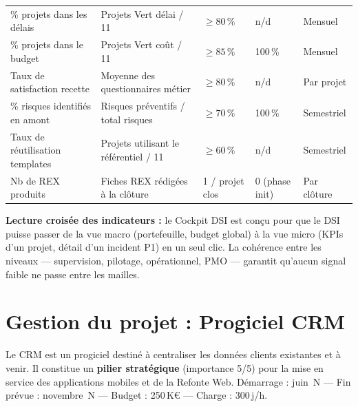 \documentclass[11pt,a4paper,oneside]{report}
\begin{document}
\vspace{4pt}
\begin{center}
\renewcommand{\arraystretch}{1.5}
\begin{tabularx}{\textwidth}{L{4.8cm} L{3.5cm} C{2cm} C{2cm} L{2cm}}
\toprule
{}
 &  &  &  &  \\
\midrule
\% projets dans les délais & Projets Vert délai / 11 & $\geq 80\,\%$ & n/d & Mensuel \\
\% projets dans le budget & Projets Vert coût / 11 & $\geq 85\,\%$ & 100\,\% & Mensuel \\
Taux de satisfaction recette & Moyenne des questionnaires métier & $\geq 80\,\%$ & n/d & Par projet \\
\% risques identifiés en amont & Risques préventifs / total risques & $\geq 70\,\%$ & 100\,\% & Semestriel \\
Taux de réutilisation templates & Projets utilisant le référentiel / 11 & $\geq 60\,\%$ & n/d & Semestriel \\
Nb de REX produits & Fiches REX rédigées à la clôture & 1 / projet clos & 0 (phase init) & Par clôture \\
\bottomrule
\end{tabularx}
\end{center}

\begin{reco}
\textbf{Lecture croisée des indicateurs :} le Cockpit DSI est conçu pour que le DSI puisse passer de la vue macro (portefeuille, budget global) à la vue micro (KPIs d'un projet, détail d'un incident P1) en un seul clic. La cohérence entre les niveaux — supervision, pilotage, opérationnel, PMO — garantit qu'aucun signal faible ne passe entre les mailles.
\end{reco}

\newpage

\chapter{Gestion du projet : Progiciel CRM}

\begin{finding}
Le CRM est un progiciel destiné à centraliser les données clients existantes et à venir. Il constitue un \textbf{pilier stratégique} (importance 5/5) pour la mise en service des applications mobiles et de la Refonte Web. Démarrage : juin~N — Fin prévue : novembre~N — Budget : 250\,K€ — Charge : 300\,j/h.
\end{finding}
\end{document}
